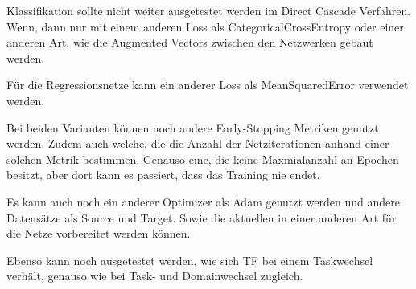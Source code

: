 
Klassifikation sollte nicht weiter ausgetestet werden im Direct Cascade Verfahren. Wenn, dann nur mit einem anderen Loss als 
CategoricalCrossEntropy oder einer anderen Art, wie die Augmented Vectors zwischen den Netzwerken gebaut werden. 

Für die Regressionsnetze kann ein anderer Loss als MeanSquaredError verwendet werden. 

Bei beiden Varianten können noch andere Early-Stopping Metriken genutzt werden. Zudem auch welche, die die Anzahl der Netziterationen anhand 
einer solchen Metrik bestimmen. Genauso eine, die keine Maxmialanzahl an Epochen besitzt, aber dort kann es passiert, dass das Training nie endet. 

Es kann auch noch ein anderer Optimizer als Adam genutzt werden und andere Datensätze als Source und Target. Sowie die aktuellen in einer anderen 
Art für die Netze vorbereitet werden können. 

Ebenso kann noch ausgetestet werden, wie sich TF bei einem Taskwechsel verhält, genauso wie bei Task- und Domainwechsel zugleich. 
